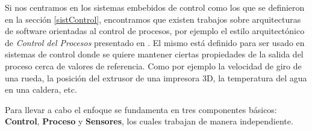 Si nos centramos en los sistemas embebidos de control como los que se definieron en la sección \ref{sistControl}, encontramos que existen trabajos sobre arquitecturas de software orientadas al control de procesos, por ejemplo el estilo arquitectónico de \textit{Control del Procesos} presentado en \cite{ShawGarlan1996}. El mismo está definido para ser usado en sistemas de control donde se quiere mantener ciertas propiedades de la salida del proceso cerca de valores de referencia. Como por ejemplo la velocidad de giro de una rueda, la posición del extrusor de una impresora 3D, la temperatura del agua en una caldera, etc.

Para llevar a cabo el enfoque se fundamenta en tres componentes básicos: \textbf{Control}, \textbf{Proceso} y \textbf{Sensores}, los cuales trabajan de manera independiente.


